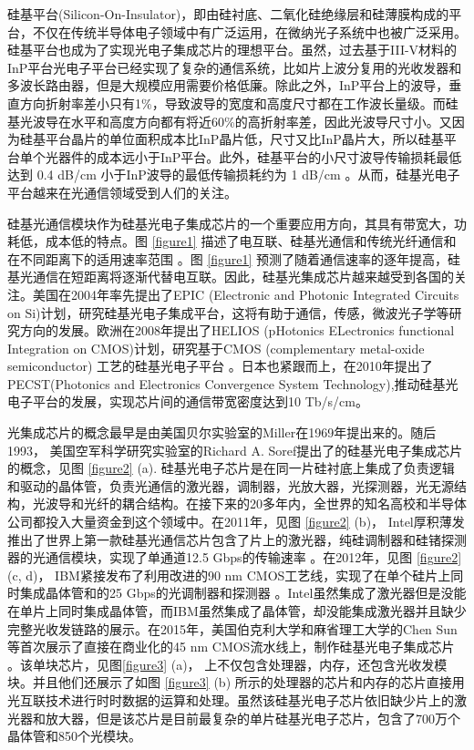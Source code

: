 硅基平台(Silicon-On-Insulator)，即由硅衬底、二氧化硅绝缘层和硅薄膜构成的平台，不仅在传统半导体电子领域中有广泛运用，在微纳光子系统中也被广泛采用。硅基平台也成为了实现光电子集成芯片的理想平台。虽然，过去基于III-V材料的InP平台光电子平台已经实现了复杂的通信系统\cite{Meint2014an}，比如片上波分复用的光收发器和多波长路由器，但是大规模应用需要价格低廉。除此之外，InP平台上的波导，垂直方向折射率差小只有1\%，导致波导的宽度和高度尺寸都在工作波长量级。而硅基光波导在水平和高度方向都有将近60\%的高折射率差，因此光波导尺寸小。又因为硅基平台晶片的单位面积成本比InP晶片低，尺寸又比InP晶片大，所以硅基平台单个光器件的成本远小于InP平台。此外，硅基平台的小尺寸波导传输损耗最低达到 0.4 dB/cm \cite{Tsuyoshi2016low} 小于InP波导的最低传输损耗约为 1 dB/cm \cite{Meint2014an}。从而，硅基光电子平台越来在光通信领域受到人们的关注。

硅基光通信模块作为硅基光电子集成芯片的一个重要应用方向，其具有带宽大，功耗低，成本低的特点。图 \ref{figure1} 描述了电互联、硅基光通信和传统光纤通信和在不同距离下的适用速率范围 \cite{Zuffada2012}。图 \ref{figure1} 预测了随着通信速率的逐年提高，硅基光通信在短距离将逐渐代替电互联。因此，硅基光集成芯片越来越受到各国的关注。美国在2004年率先提出了EPIC (Electronic and Photonic Integrated Circuits on Si)计划，研究硅基光电子集成平台，这将有助于通信，传感，微波光子学等研究方向的发展\cite{Shah2005}。欧洲在2008年提出了HELIOS (pHotonics ELectronics functional Integration on CMOS)计划，研究基于CMOS (complementary metal-oxide semiconductor) 工艺的硅基光电子平台 \cite{HELIOS}。日本也紧跟而上，在2010年提出了PECST(Photonics and Electronics Convergence System Technology),推动硅基光电子平台的发展，实现芯片间的通信带宽密度达到10 Tb/s/cm\cite{Arakawa2013Silicon}。

光集成芯片的概念最早是由美国贝尔实验室的Miller在1969年提出来的\cite{miller1969}。随后1993， 美国空军科学研究实验室的Richard A. Soref提出了的硅基光电子集成芯片的概念\cite{Soref1993}，见图 \ref{figure2} (a). 硅基光电子芯片是在同一片硅衬底上集成了负责逻辑和驱动的晶体管，负责光通信的激光器，调制器，光放大器，光探测器，光无源结构，光波导和光纤的耦合结构。在接下来的20多年内，全世界的知名高校和半导体公司都投入大量资金到这个领域中。在2011年，见图 \ref{figure2} (b)， Intel厚积薄发推出了世界上第一款硅基光通信芯片包含了片上的激光器，纯硅调制器和硅锗探测器的光通信模块，实现了单通道12.5 Gbps的传输速率 \cite{Paniccia2011}。在2012年，见图 \ref{figure2} (c, d)， IBM紧接发布了利用改进的90 nm CMOS工艺线，实现了在单个硅片上同时集成晶体管和的25 Gbps的光调制器和探测器 \cite{Assefa2012}。Intel虽然集成了激光器但是没能在单片上同时集成晶体管，而IBM虽然集成了晶体管，却没能集成激光器并且缺少完整光收发链路的展示。在2015年，美国伯克利大学和麻省理工大学的Chen Sun等首次展示了直接在商业化的45 nm CMOS流水线上，制作硅基光电子集成芯片 \cite{sun2015single}。该单块芯片，见图\ref{figure3} (a)， 上不仅包含处理器，内存，还包含光收发模块。并且他们还展示了如图 \ref{figure3} (b) 所示的处理器的芯片和内存的芯片直接用光互联技术进行时时数据的运算和处理。虽然该硅基光电子芯片依旧缺少片上的激光器和放大器，但是该芯片是目前最复杂的单片硅基光电子芯片，包含了700万个晶体管和850个光模块。

